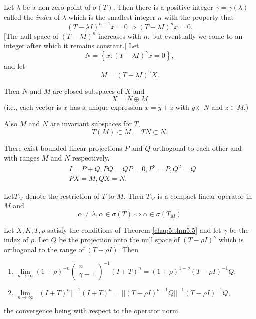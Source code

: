  Let $\lambda$ be a non-zero point of $\sigma (T)$. Then there is a
 positive integer $\gamma = \gamma (\lambda)$ called the \textit{index} of
 $\lambda$ which is the smallest integer $n$ with the property that 
 $$
 (T -\lambda I)^{n+1} x=0 \Rightarrow (T -\lambda I)^n x =0.
 $$
 [The null space of $(T -\lambda I)^n$ increases with  $n$, but
   eventually we come to an integer after which it remains constant.]
 Let 
$$N=\left\{ x: (T-\lambda I)^\gamma x=0\right\},$$ and let 
 $$
 M=(T-\lambda I)^\gamma X.
 $$
 
 Then $N$ and $M$ are closed subspaces of $X$ and
 \begin{equation}
   X=N \oplus M \tag{1}
 \end{equation} 
 (i.e., each vector is $x$ has a unique expression $x=y+z$ with $y
 \in N$ and $z \in M$.) 
 
 Also $M$ and $N$ are invariant subspaces for $T$,
 $$
 T (M) \subset M, \quad TN \subset N.
$$

There exist bounded linear projections $P$ and $Q$ orthogonal to each
other and with ranges $M$ and $N$ respectively. 
\begin{align*}
  & I = P + Q , P Q = Q P = 0, P^2 = P, Q^2 = Q \tag{2}\\
  & P X = M , Q X =N.
\end{align*}

Let\pageoriginale $T_M$ denote the restriction of $T$ to $M$. Then
$T_M$ is a compact linear operator in $M$ and  
\begin{equation}
  \alpha \neq \lambda, \alpha \in \sigma (T)
  \Longleftrightarrow  \alpha \in \sigma (T_M)\tag{3} 
\end{equation}

\begin{thmm}\label{chap5:thm5.6}%
  Let $X, K,  T, \rho$ satisfy the conditions of Theorem
  \ref{chap5:thm5.5} and let $\gamma$ be the index of $\rho$. Let $Q$
  be the projection onto the null space of $(T - \rho I)^\gamma$ which
  is orthogonal to the range of $(T -\rho I)$. Then  
  \begin{enumerate}[\rm(i)]
  \item $\lim\limits_{n \to \infty} (1+ \rho)^{-n} \begin{pmatrix} n
    \\\gamma-1\end{pmatrix}^{-1} (I+T)^n = (1+\rho)^{1-\nu} (T-\rho I)^{-1}
    Q$, 
  \item $ \lim\limits_{n \to \infty} ||(I + T)^n||^{-1} (I+T)^n =
    ||(T-\rho I)^{\nu-1} Q ||^{-1} (T-\rho I)^{-1} Q$, 
  \end{enumerate}
  the convergence being with respect to the operator norm.
\end{thmm}

